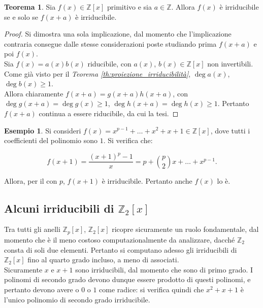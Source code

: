 \documentclass[a4paper]{article}
\newcommand{\ZZ}{\mathbb{Z}}
\newcommand{\ZZpx}{\mathbb{Z}_p[x]}
\newcommand{\ZZx}{\mathbb{Z}[x]}
\theoremstyle{definition}
\newtheorem{example}{Esempio}[section]
\newtheorem{theorem}{Teorema}[section]
\begin{document}
\begin{theorem}
    Sia $f(x) \in \ZZx$ primitivo e sia $a \in \ZZ$. Allora $f(x)$ è
    irriducibile se e solo se $f(x+a)$ è irriducibile.
\end{theorem}

\begin{proof}
    Si dimostra una sola implicazione, dal momento che l'implicazione
    contraria consegue dalle stesse considerazioni poste
    studiando prima $f(x+a)$ e poi $f(x)$. \\

    Sia $f(x)=a(x)b(x)$ riducibile, con $a(x)$, $b(x) \in \ZZx$ non
    invertibili. Come già visto per il \textit{Teorema
        \ref{th:proiezione_irriducibilità}}, $\deg a(x)$, $\deg b(x) \geq 1$. \\

    Allora chiaramente $f(x+a)=g(x+a)h(x+a)$, con $\deg g(x+a) =
        \deg g(x) \geq 1$, $\deg h(x+a) = \deg h(x) \geq 1$. Pertanto
    $f(x+a)$ continua a essere riducibile, da cui la tesi.
\end{proof}

\begin{example}
    Si consideri $f(x) = x^{p-1}+\ldots+x^2+x+1 \in \ZZx$, dove
    tutti i coefficienti del polinomio sono $1$. Si verifica che:

    \[ f(x+1)=\frac{(x+1)^p-1}x = p+\binom{p}{2}x+\ldots+x^{p-1}. \]

    Allora, per il  con $p$, $f(x+1)$ è
    irriducibile. Pertanto anche $f(x)$ lo è.
\end{example}

\subsection{Alcuni irriducibili di $\ZZ_2[x]$}

Tra tutti gli anelli $\ZZpx$, $\ZZ_2[x]$ ricopre sicuramente
un ruolo fondamentale, dal momento che è il meno costoso
computazionalmente da analizzare, dacché $\ZZ_2$ consta
di soli due elementi. Pertanto si computano adesso gli
irriducibili di $\ZZ_2[x]$ fino al quarto grado incluso, a meno
di associati. \\

Sicuramente $x$ e $x+1$ sono irriducibili, dal momento che sono di
primo grado. I polinomi di secondo grado devono dunque essere
prodotto di questi polinomi, e pertanto devono avere o $0$ o
$1$ come radice: si verifica quindi che $x^2+x+1$ è l'unico
polinomio di secondo grado irriducibile. \\
\end{document}
